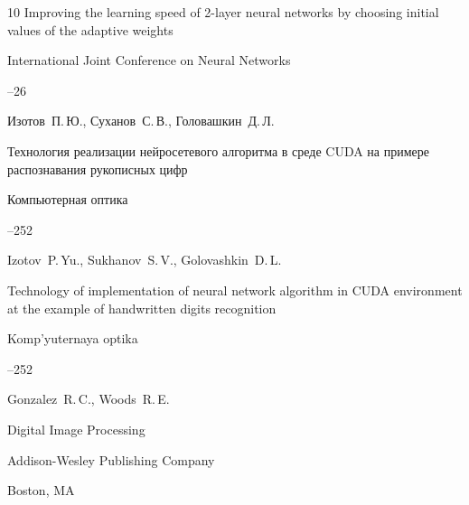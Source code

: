 \begin{thebibliography}{10}
\paper Improving the learning speed of 2-layer neural networks by choosing initial values of the adaptive weights

\inbook International Joint Conference on  Neural Networks 



--26





\by Изотов~П.\,Ю., Суханов~С.\,В., Головашкин~Д.\,Л.

\paper Технология реализации нейросетевого алгоритма в среде CUDA на примере распознавания рукописных цифр

\jour Компьютерная оптика




--252

\misctransl 

\by Izotov~P.\,Yu., Sukhanov~S.\,V.,  Golovashkin~D.\,L.

\paper Technology of implementation of neural network algorithm in CUDA environment at the example of handwritten digits recognition

\jour Komp'yuternaya optika




--252




\by Gonzalez~R.\,C., Woods~R.\,E.

\book Digital Image Processing

\publ Addison-Wesley Publishing Company

\publaddr Boston, MA





\end{thebibliography}



\noindent

\hskip6.5cm \thedate \par\noindent

\hskip6.5cm\therevdate







\makeengtitle



\newpage



%

